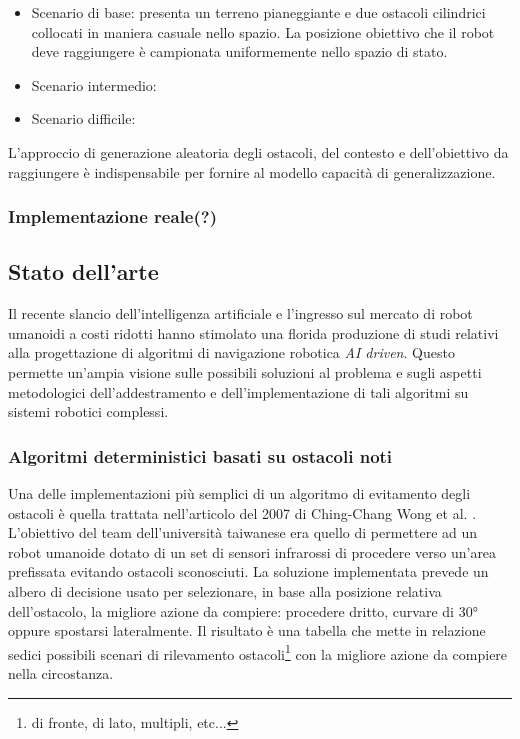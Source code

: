 \begin{itemize}
    \item Scenario di base: presenta un terreno pianeggiante e due ostacoli cilindrici collocati in maniera casuale nello spazio. La posizione obiettivo che il robot deve raggiungere è campionata uniformemente nello spazio di stato.  
    \item Scenario intermedio:
    \item Scenario difficile:
\end{itemize}

L'approccio di generazione aleatoria degli ostacoli, del contesto e dell'obiettivo da raggiungere è indispensabile per fornire al modello capacità di generalizzazione. 




\subsubsection{Implementazione reale(?)}


\subsection{Stato dell'arte}
Il recente slancio dell'intelligenza artificiale e l'ingresso sul mercato di robot umanoidi a costi ridotti hanno stimolato una florida produzione di studi relativi alla progettazione di algoritmi di navigazione robotica \textit{AI driven}. Questo permette un'ampia visione sulle possibili soluzioni al problema e sugli aspetti metodologici dell'addestramento e dell'implementazione di tali algoritmi su sistemi robotici complessi. 


\subsubsection{Algoritmi deterministici basati su ostacoli noti}
Una delle implementazioni più semplici di un algoritmo di evitamento degli ostacoli è quella trattata nell'articolo del 2007 di Ching-Chang Wong et al. \cite{wong2007design}. L'obiettivo del team dell'università taiwanese era quello di permettere ad un robot umanoide dotato di un set di sensori infrarossi di procedere verso un'area prefissata evitando ostacoli sconosciuti. La soluzione implementata prevede un albero di decisione usato per selezionare, in base alla posizione relativa dell'ostacolo, la migliore azione da compiere: procedere dritto, curvare di 30° oppure spostarsi lateralmente. Il risultato è una tabella che mette in relazione sedici possibili scenari di rilevamento ostacoli\footnote{di fronte, di lato, multipli, etc...} con la migliore azione da compiere nella circostanza.

